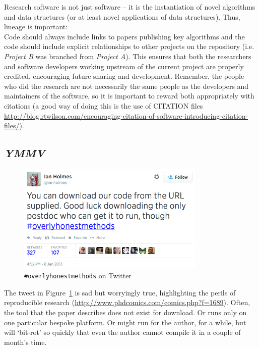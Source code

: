 \documentclass[a4paper,11pt]{article}
\begin{document}
Research software is not just software -- it is the instantiation of
novel algorithms and data structures (or at least novel applications
of data structures). Thus, lineage is important:\\

 Code should always
include links to papers publishing key algorithms and the code should
include explicit relationships to other projects on the repository
(i.e. {\emph{Project B}} was branched from {\emph{Project A}}). This
ensures that both the researchers and software developers working
upstream of the current project are properly credited, encouraging
future sharing and development. Remember, the people who did the
research are not necessarily the same people as the developers and
maintainers of the software, so it is important to reward both
appropriately with citations (a good way of doing this is the use of
CITATION
files \url{http://blog.rtwilson.com/encouraging-citation-of-software-introducing-citation-files/}).

\subsection{{\emph{YMMV}}}

\begin{figure}[!ht]
\centering
\includegraphics[width=0.8\textwidth]{images/overlyhonesttweet.png}
\caption{{\texttt{\#overlyhonestmethods}} on Twitter}
\label{fig:overlyhonestmethod} 
\end{figure}

The tweet in Figure~\ref{fig:overlyhonestmethod} is sad but worryingly
true, highlighting the perils of reproducible
research (\url{http://www.phdcomics.com/comics.php?f=1689}). Often,
the tool that the paper describes does not exist for download. Or runs
only on one particular bespoke platform. Or might run for the author,
for a while, but will `bit-rot' so quickly that even the author cannot
compile it in a couple of month's time.\\
\end{document}
